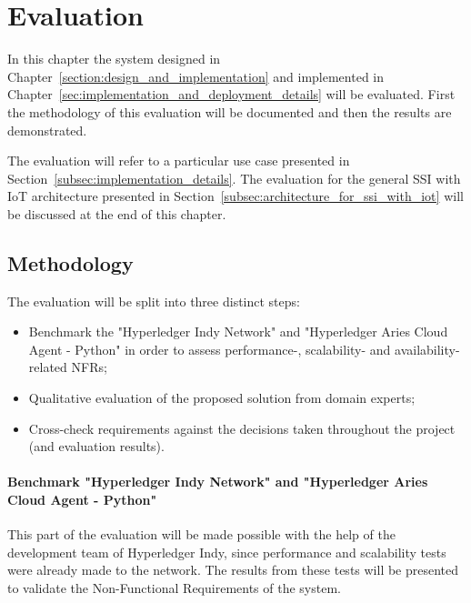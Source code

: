 \section{Evaluation}
\label{section:evaluation}

In this chapter the system designed in Chapter~\ref{section:design_and_implementation} and implemented in Chapter~\ref{sec:implementation_and_deployment_details} will be evaluated. First the methodology of this evaluation will be documented and then the results are demonstrated.

The evaluation will refer to a particular use case presented in Section~\ref{subsec:implementation_details}. The evaluation for the general SSI with IoT architecture presented in Section~\ref{subsec:architecture_for_ssi_with_iot} will be discussed at the end of this chapter. 

\subsection{Methodology}
\label{subsec:methodology}


The evaluation will be split into three distinct steps:

\begin{itemize}
    \item Benchmark the "Hyperledger Indy Network" and "Hyperledger Aries Cloud Agent - Python" in order to assess performance-, scalability- and availability-related NFRs;
    \item Qualitative evaluation of the proposed solution from domain experts;
    \item Cross-check requirements against the decisions taken throughout the project (and evaluation results).
\end{itemize}

\paragraph{Benchmark "Hyperledger Indy Network" and "Hyperledger Aries Cloud Agent - Python"}

This part of the evaluation will be made possible with the help of the development team of Hyperledger Indy, since performance and scalability tests were already made to the network. The results from these tests will be presented to validate the Non-Functional Requirements of the system.

